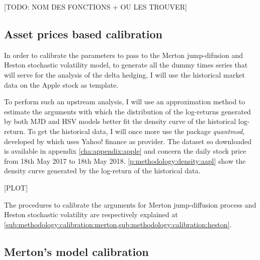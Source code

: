 \documentclass[12pt]{report}
\begin{document}
[TODO: NOM DES FONCTIONS + OU LES TROUVER]
 

\subsection{Asset prices based calibration}
\label{sub:methodology:calibration:asset}

In order to calibrate the parameters to pass to the Merton jump-difusion and Heston stochastic volatility model, to generate all the dummy times series that will serve for the analysis of the delta hedging, I will use the historical market data on the Apple stock as template.

To perform such an upstream analysis, I will use an approximation method to estimate the arguments with which the distribution of the log-returns generated by both MJD and HSV models better fit the density curve of the historical log-return.
To get the historical data, I will once more use the package \textit{quantmod}, developed by \citet{quantmod} which uses Yahoo! finance as provider. The dataset so downloaded is available in appendix \ref{cha:appendix:apple} and concern the daily stock price from 18th May 2017 to 18th May 2018.
\cref{p:methodology:density:aapl} show the density curve generated by the log-return of the historical data.

[PLOT]


The procedures to calibrate the arguments for Merton jump-diffusion process and Heston stochastic volatility are respectively explained at \cref{sub:methodology:calibration:merton,sub:methodology:calibration:heston}.



\subsection{Merton's model calibration}
\label{sub:methodology:calibration:merton}


\end{document}
